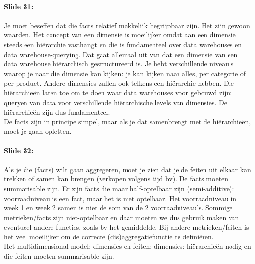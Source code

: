 \documentclass[10pt,a4paper]{report}
\begin{document}
\paragraph{Slide 31:}Je moet beseffen dat die facts relatief makkelijk begrijpbaar zijn. Het zijn gewoon waarden. Het concept van een dimensie is moeilijker omdat aan een dimensie steeds een hi\"erarchie vasthangt en die is fundamenteel over data warehouses en data warehouse-querying. Dat gaat allemaal uit van dat een dimensie van een data warehouse hi\"erarchisch gestructureerd is. Je hebt verschillende niveau's waarop je naar die dimensie kan kijken: je kan kijken naar alles, per categorie of per product. Andere dimensies zullen ook telkens een hi\"erarchie hebben. Die hi\"erarchieën laten toe om te doen waar data warehouses voor gebouwd zijn: queryen van data voor verschillende hi\"erarchische levels van dimensies. De hi\"erarchieën zijn dus fundamenteel.\\
De facts zijn in principe simpel, maar als je dat samenbrengt met de hi\"erarchieën, moet je gaan opletten.

\paragraph{Slide 32:}Als je die (facts) wilt gaan aggregeren, moet je zien dat je de feiten uit elkaar kan trekken of samen kan brengen (verkopen volgens tijd bv). De facts moeten summarisable zijn. Er zijn facts die maar half-optelbaar zijn (semi-additive): voorraadniveau is een fact, maar het is niet optelbaar. Het voorraadniveau in week 1 en week 2 samen is niet de som van de 2 voorraadniveau's. Sommige metrieken/facts zijn niet-optelbaar en daar moeten we dus gebruik maken van eventueel andere functies, zoals bv het gemiddelde. Bij andere metrieken/feiten is het veel moeilijker om de correcte (dis)aggregatiefunctie te definiëren.\\
Het multidimensional model: dimensies en feiten: dimensies: hi\"erarchieën nodig en die feiten moeten summarisable zijn.
\end{document}
